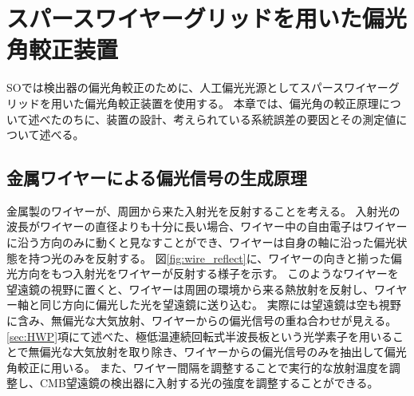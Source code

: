 \documentclass[../../main.tex]{subfiles}
\begin{document}
\chapter{スパースワイヤーグリッドを用いた偏光角較正装置}
\label{chap:wiregrid}
SOでは検出器の偏光角較正のために、人工偏光光源としてスパースワイヤーグリッドを用いた偏光角較正装置を使用する\cite{Tajima_2012}\cite{swg:Murata_2023}。
本章では、偏光角の較正原理について述べたのちに、装置の設計、考えられている系統誤差の要因とその測定値について述べる。

\section{金属ワイヤーによる偏光信号の生成原理}
\label{sec:wiregrid_principle}
金属製のワイヤーが、周囲から来た入射光を反射することを考える。
入射光の波長がワイヤーの直径よりも十分に長い場合、ワイヤー中の自由電子はワイヤーに沿う方向のみに動くと見なすことができ、ワイヤーは自身の軸に沿った偏光状態を持つ光のみを反射する。
図\ref{fig:wire_reflect}に、ワイヤーの向きと揃った偏光方向をもつ入射光をワイヤーが反射する様子を示す。
このようなワイヤーを望遠鏡の視野に置くと、ワイヤーは周囲の環境から来る熱放射を反射し、ワイヤー軸と同じ方向に偏光した光を望遠鏡に送り込む。
実際には望遠鏡は空も視野に含み、無偏光な大気放射、ワイヤーからの偏光信号の重ね合わせが見える。
\ref{sec:HWP}項にて述べた、極低温連続回転式半波長板という光学素子を用いることで無偏光な大気放射を取り除き、ワイヤーからの偏光信号のみを抽出して偏光角較正に用いる。
また、ワイヤー間隔を調整することで実行的な放射温度を調整し、CMB望遠鏡の検出器に入射する光の強度を調整することができる。
\end{document}
